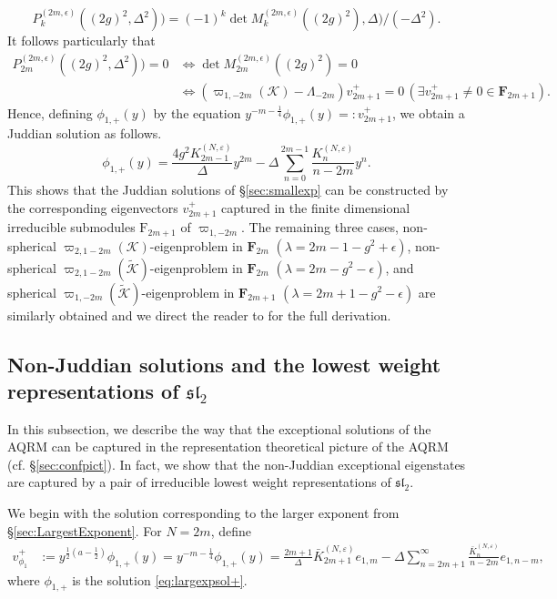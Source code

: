 \documentclass[11pt]{article}
\numberwithin{equation}{section}
\newcommand{\e}{\varepsilon}
\newcommand{\RpnSymbol}[1]{\bm{\mathrm{#1}}}
\newcommand{\rF}{\RpnSymbol{F}}
\theoremstyle{plain}
\theoremstyle{definition}
\theoremstyle{remark}
\begin{document}
$$
P^{(2m,\epsilon)}_k((2g)^2, \Delta^2))= (-1)^k \det M_{k}^{(2m,\epsilon)}((2g)^2), \Delta)/(-\Delta^2).
$$
It follows particularly that 
\begin{align*}
P^{(2m,\epsilon)}_{2m}((2g)^2, \Delta^2))=0 
& \Longleftrightarrow  
\det M_{2m}^{(2m,\epsilon)}((2g)^2)=0\\
& \Longleftrightarrow  
(\varpi_{1,-2m}(\mathcal{K})-\Lambda_{-2m})v^+_{2m+1}=0 
\, (\exists v^+_{2m+1} \not=0 \in \mathbf{F}_{2m+1}).
\end{align*}
Hence, defining \(\phi_{1,+}(y)\) by the equation \(y^{-m-\frac14}\phi_{1,+}(y)=:v^+_{2m+1}\), we obtain a Juddian solution as follows. 
 \[
    \phi_{1,+}(y) = \frac{4 g^2 K^{(N,\e)}_{2m-1}}{\Delta} y^{2m}   - \Delta \sum_{n=0}^{2m-1} \frac{K^{(N,\e)}_n}{n-2m} y^n.
  \]
This shows that the Juddian solutions of \S \ref{sec:smallexp} can be constructed by 
  the corresponding eigenvectors \(v^+_{2m+1}\) captured in the finite dimensional irreducible submodules
  \(\rF_{2m+1}\) of \(\varpi_{1,-2m}\). The remaining three cases, non-spherical $\varpi_{2,1-2m}(\mathcal{K})$-eigenproblem in $\mathbf{F}_{2m}$ $(\lambda=2m-1-g^2+\epsilon)$, non-spherical $\varpi_{2,1-2m}(\tilde{\mathcal{K}})$-eigenproblem in $\mathbf{F}_{2m}$ $(\lambda=2m-g^2-\epsilon)$, and spherical $\varpi_{1,-2m}(\tilde{\mathcal{K}})$-eigenproblem in $\mathbf{F}_{2m+1}$ $(\lambda=2m+1-g^2-\epsilon)$ are similarly obtained and we direct the reader to \cite{W2016JPA} for the full derivation.
  


\subsection{Non-Juddian solutions and the lowest weight representations of $\mathfrak{sl}_2$} 
\label{sec:exceptandrepn}

In this subsection, we describe the way that the exceptional solutions of the AQRM can be captured in
the representation theoretical picture of the AQRM (cf. \S \ref{sec:confpict}). In fact, we show that the non-Juddian
exceptional eigenstates are captured by a pair of irreducible lowest weight representations of $\mathfrak{sl}_2$.

We begin with the solution corresponding to the larger exponent from \S \ref{sec:LargestExponent}.
For \( N = 2 m \), define
\begin{align}\label{eq:defvecD}
  v^+_{\phi_1} &:= y^{\frac{1}{2}(a - \frac{1}{2})} \phi_{1,+}(y) = y^{-m - \frac{1}{4}} \phi_{1,+}(y) = \frac{2 m+1}{\Delta}\bar{K}^{(N,\e)}_{2 m+1} e_{1,m}  - \Delta \sum_{n=2 m+1}^\infty \frac{\bar{K}^{(N,\e)}_n}{n - 2 m}  e_{1,n-m},
\end{align}
where \(\phi_{1,+}\) is the solution \eqref{eq:largexpsol+}.
\end{document}
